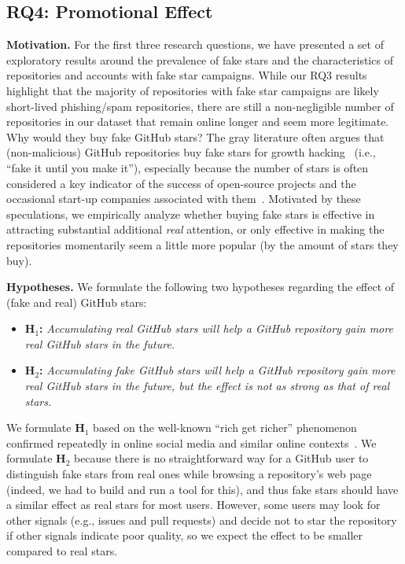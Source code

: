 \subsection{RQ4: Promotional Effect}
\label{sec:rq4}

\textbf{Motivation.}
For the first three research questions, we have presented a set of exploratory results around the prevalence of fake stars and the characteristics of repositories and accounts with fake star campaigns.
While our RQ3 results highlight that the majority of repositories with fake star campaigns are likely short-lived phishing/spam repositories, there are still a non-negligible number of repositories in our dataset that remain online longer and seem more legitimate.
Why would they buy fake GitHub stars?
The gray literature often argues that (non-malicious) GitHub repositories buy fake stars for growth hacking~\cite{bohnsack2019hack}
(i.e., ``fake it until you make it''), especially because the number of stars is often considered a key indicator of the success of open-source projects and the occasional start-up companies associated with them~\cite{startup-stars}.
Motivated by these speculations, we empirically analyze whether buying fake stars is effective in attracting substantial additional \emph{real} attention, or only effective in making the repositories momentarily seem a little more popular (by the amount of stars they buy).

\textbf{Hypotheses.}
We formulate the following two hypotheses regarding the effect of (fake and real) GitHub stars:
\begin{itemize}[leftmargin=15pt]
    \item \textbf{H$_1$:} \emph{Accumulating real GitHub stars will help a GitHub repository gain more real GitHub stars in the future.}
    \item \textbf{H$_2$:} \emph{Accumulating fake GitHub stars will help a GitHub repository gain more real GitHub stars in the future, but the effect is not as strong as that of real stars.}
\end{itemize}
We formulate \textbf{H$_1$} based on the well-known ``rich get richer'' phenomenon confirmed repeatedly in online social media and similar online contexts~\cite{DBLP:journals/corr/ZhuL16, hagar2022concentration}.
We formulate \textbf{H$_2$} because there is no straightforward way for a GitHub user to distinguish fake stars from real ones while browsing a repository's web page (indeed, we had to build and run a tool for this), and thus fake stars should have a similar effect as real stars for most users.
However, some users may look for other signals (e.g., issues and pull requests) and decide not to star the repository if other signals indicate poor quality, so we expect the effect to be smaller compared to real stars.

